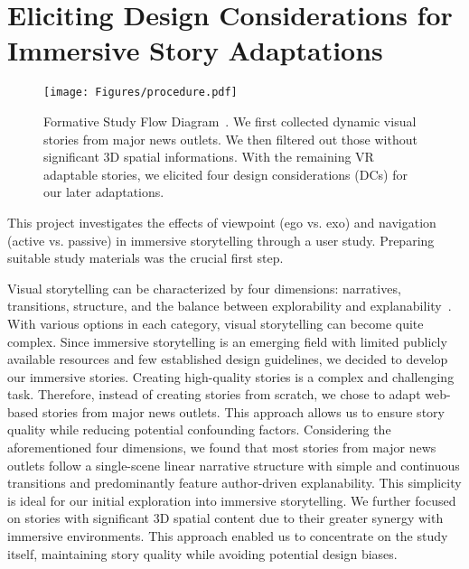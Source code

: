 \section{Eliciting Design Considerations for Immersive Story Adaptations}
\label{sec:formative}

\begin{figure*}[t]
\centering
  \texttt{[image: Figures/procedure.pdf]}
  \caption{Formative Study Flow Diagram~\cite{page2021prisma}. We first collected dynamic visual stories from major news outlets. We then filtered out those without significant 3D spatial informations. With the remaining VR adaptable stories, we elicited four design considerations (DCs) for our later adaptations.}
  \label{fig:coding_procedure}
\end{figure*}

This project investigates the effects of viewpoint (ego vs. exo) and navigation (active vs. passive) in immersive storytelling through a user study. Preparing suitable study materials was the crucial first step.

{Visual storytelling can be characterized by four dimensions: narratives, transitions, structure, and the balance between explorability and explanability~\cite{stolper2018data, thudt2018exploration}. With various options in each category, visual storytelling can become quite complex. Since immersive storytelling is an emerging field with limited publicly available resources and few established design guidelines, we decided to develop our immersive stories.
Creating high-quality stories is a complex and challenging task. Therefore, instead of creating stories from scratch, we chose to adapt web-based stories from major news outlets. This approach allows us to ensure story quality while reducing potential confounding factors.
Considering the aforementioned four dimensions, we found that most stories from major news outlets follow a single-scene linear narrative structure with simple and continuous transitions and predominantly feature author-driven explanability. This simplicity is ideal for our initial exploration into immersive storytelling.
We further focused on stories with significant 3D spatial content due to their greater synergy with immersive environments. This approach enabled us to concentrate on the study itself, maintaining story quality while avoiding potential design biases.
}

